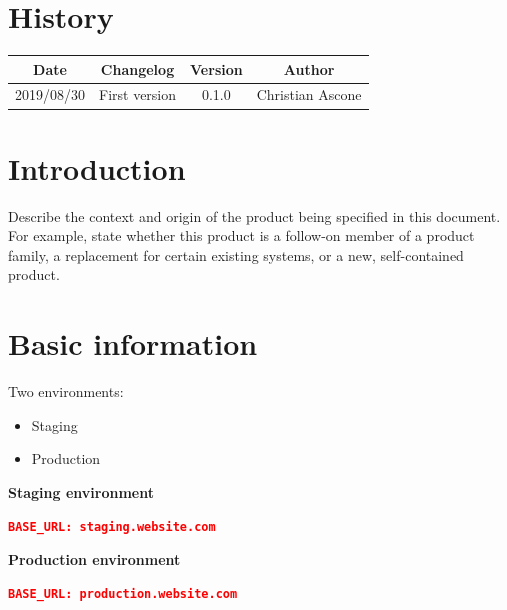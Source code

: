 \documentclass{scrreprt}
\begin{document}
\tableofcontents


\chapter*{History}

\begin{center}
    \begin{tabular}{|c|c|c|c|}
        \hline
	    Date & Changelog & Version & Author\\
        \hline
	    2019/08/30 & First version & 0.1.0 & Christian Ascone\\
	    \hline
    \end{tabular}
\end{center}

\pagestyle{fancy}
\fancyhf{}
\fancyfoot[CE,CO]{\thepage}

\chapter{Introduction}

Describe the context and origin of the product being specified in this document.  
For example, state whether this product is a follow-on member of a product 
family, a replacement for certain existing systems, or a new, self-contained 
product.

\chapter{Basic information}

Two environments:
\begin{itemize}
    \item Staging
    \item Production
\end{itemize}


\textbf{Staging environment}
\begin{lstlisting}[language=json,firstnumber=1]
BASE_URL: staging.website.com
\end{lstlisting}

\textbf{Production environment}
\begin{lstlisting}[language=json,firstnumber=1]
BASE_URL: production.website.com
\end{lstlisting}
\end{document}
